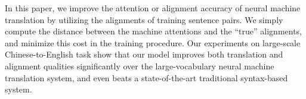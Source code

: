 In this paper, we improve the attention or alignment accuracy of neural machine translation by utilizing the alignments of training sentence pairs. We simply compute the distance between the machine attentions and the ``true'' alignments, and minimize this cost in the training procedure. Our experiments on large-scale Chinese-to-English task show that our model improves both translation and alignment qualities significantly over the large-vocabulary neural machine translation system, and even beats a state-of-the-art traditional syntax-based system.
